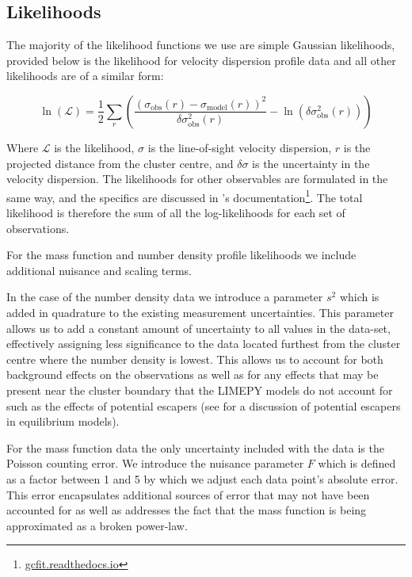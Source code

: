 \subsection{Likelihoods}

The majority of the likelihood functions we use are simple Gaussian likelihoods, provided below is
the likelihood for velocity dispersion profile data and all other likelihoods are of a similar form:

\begin{equation}
    \ln \left(\mathcal{L}\right)=\frac{1}{2}
    \sum_{r}\left(\frac{\left(\sigma_{\mathrm{obs}}(r)
        -\sigma_{\mathrm{model}}(r)\right)^{2}}{\delta \sigma_{\mathrm{obs}}^{2}(r)}
    -\ln \left(\delta \sigma_{\mathrm{obs}}^{2}(r)\right)\right)
\end{equation}

Where $\mathcal{L}$ is the likelihood, $\sigma$ is the line-of-sight velocity dispersion, $r$ is the
projected distance from the cluster centre, and $\delta \sigma$ is the uncertainty in the velocity
dispersion. The likelihoods for other observables are formulated in the same way, and the specifics
are discussed in 's documentation\footnote{\url{gcfit.readthedocs.io}}. The total
likelihood is therefore the sum of all the log-likelihoods for each set of observations.

For the mass function and number density profile likelihoods we include additional nuisance and scaling
terms.

In the case of the number density data we introduce a parameter $s^2$ which is added in quadrature
to the existing measurement uncertainties. This parameter allows us to add a constant amount of
uncertainty to all values in the data-set, effectively assigning less significance to the data
located furthest from the cluster centre where the number density is lowest. This allows us to
account for both background effects on the observations as well as for any effects that may be
present near the cluster boundary that the LIMEPY models do not account for such as the effects of
potential escapers (see \citealt{Claydon2019} for a discussion of potential escapers in equilibrium
models).

For the mass function data the only uncertainty included with the data is the Poisson counting
error. We introduce the nuisance parameter $F$ which is defined as a factor between 1 and 5 by which
we adjust each data point's absolute error. This error encapsulates additional sources of error that
may not have been accounted for as well as addresses the fact that the mass function is being
approximated as a broken power-law.


